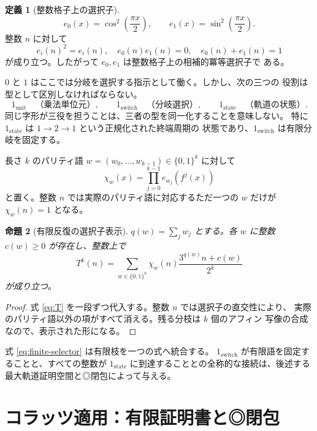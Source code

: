 \documentclass[a4paper,11pt]{ltjsarticle}
\theoremstyle{definition}
\newtheorem{definition}{定義}[section]
\theoremstyle{plain}
\newtheorem{proposition}[definition]{命題}
\newcommand{\1}{\mathbf{1}}
\begin{document}
\begin{definition}[整数格子上の選択子]
\[
 e_0(x)=\cos^2\!\left(\frac{\pi x}{2}\right),\qquad
 e_1(x)=\sin^2\!\left(\frac{\pi x}{2}\right).
\]
整数 $n$ に対して
\[
 e_i(n)^2=e_i(n),\quad e_0(n)e_1(n)=0,
 \quad e_0(n)+e_1(n)=1
\]
が成り立つ。したがって $e_0,e_1$ は整数格子上の相補的冪等選択子で
ある。
\end{definition}

$0$ と $1$ はここでは分岐を選択する指示として働く。しかし、次の三つの
役割は型として区別しなければならない。
\[
 1_{\mathrm{unit}}\quad\text{（乗法単位元）},\qquad
 1_{\mathrm{switch}}\quad\text{（分岐選択）},\qquad
 1_{\mathrm{state}}\quad\text{（軌道の状態）}.
\]
同じ字形が三役を担うことは、三者の型を同一化することを意味しない。
特に $1_{\mathrm{state}}$ は $1\to2\to1$ という正規化された終端周期の
状態であり、$1_{\mathrm{switch}}$ は有限分岐を固定する。

長さ $k$ のパリティ語 $w=(w_0,\ldots,w_{k-1})\in\{0,1\}^k$ に対して
\begin{equation}\label{eq:selector}
 \chi_w(x)=\prod_{j=0}^{k-1}e_{w_j}(f^j(x))
\end{equation}
と置く。整数 $n$ では実際のパリティ語に対応するただ一つの $w$ だけが
$\chi_w(n)=1$ となる。

\begin{proposition}[有限反復の選択子表示]
$q(w)=\sum_jw_j$ とする。各 $w$ に整数 $c(w)\ge0$ が存在し、整数上で
\begin{equation}\label{eq:finite-selector}
 T^k(n)=\sum_{w\in\{0,1\}^k}
 \chi_w(n)\frac{3^{q(w)}n+c(w)}{2^k}
\end{equation}
が成り立つ。
\end{proposition}

\begin{proof}
式 \eqref{eq:T} を一段ずつ代入する。整数 $n$ では選択子の直交性により、
実際のパリティ語以外の項がすべて消える。残る分枝は $k$ 個のアフィン
写像の合成なので、表示された形になる。
\end{proof}

式 \eqref{eq:finite-selector} は有限枝を一つの式へ統合する。
$1_{\mathrm{switch}}$ が有限語を固定することと、すべての整数が
$1_{\mathrm{state}}$ に到達することとの全称的な接続は、後述する
最大軌道証明空間と◎閉包によって与える。

\part{コラッツ適用：有限証明書と◎閉包}
\end{document}
